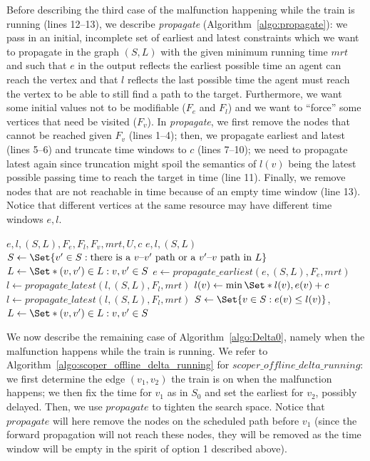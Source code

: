 \documentclass{article}
\begin{document}
Before describing the third case of the malfunction happening while the train is running (lines 12--13), we describe \emph{propagate} (Algorithm~\ref{algo:propagate}): we pass in an initial, incomplete set of earliest and latest constraints which we want to propagate in the graph $(S,L)$ with the given minimum running time $mrt$ and such that $e$ in the output reflects the earliest possible time an agent can reach the vertex and that  $l$ reflects the last possible time the agent must reach the vertex to be able to still find a path to the target. Furthermore, we want some initial values not to be modifiable ($F_e$ and $F_l$) and we want to ``force'' some vertices that need be visited ($F_v$). In \emph{propagate}, we first remove the nodes that cannot be reached given $F_v$ (lines 1--4); then, we propagate earliest and latest (lines 5--6) and truncate time windows to $c$ (lines 7--10); we need to propagate latest again since truncation might spoil the semantics of $l(v)$ being the latest possible passing time to reach the target in time (line 11). Finally, we remove nodes that are not reachable in time because of an empty time window (line 13). Notice that different vertices at the same resource may have different time windows $e,l$.

\begin{algorithm}
	\caption{$propagate$} \label{algo:propagate}
	\begin{algorithmic}[1]
	    \Require $e,l,(S,L),F_e,F_l,F_v,mrt,U,c$
	    \Ensure $e,l,(S,L)$
		    \State $S \leftarrow \Set{v^\prime \in S: \textrm{there is a }v\textrm{--}v^\prime\textrm{ path or a }v^\prime\textrm{--}v\textrm{ path in }L}$
		    \State $L \leftarrow \Set*{(v,v^\prime) \in L: v,v^\prime \in S}$
		\EndFor
	    \State $e \leftarrow propagate\_earliest(e, (S,L), F_e, mrt)$
		\State $l \leftarrow propagate\_latest(l,(S,L),F_l, mrt)$
	        \State $l(v) \leftarrow \min \Set*{l(v), e(v)+c}$
	    \EndFor
	    \State $l \leftarrow propagate\_latest(l,(S,L),F_l, mrt)$
	    \EndIf
		\State $S \leftarrow \Set{v \in S: e(v) \leq l(v)}$, $L \leftarrow \Set*{(v,v^\prime) \in L: v,v^\prime \in S}$

	\end{algorithmic}
\end{algorithm}



We now describe the remaining case of Algorithm~\ref{algo:Delta0}, namely when the malfunction happens while the train is running. We refer to Algorithm~\ref{algo:scoper_offline_delta_running} for $scoper\_offline\_delta\_running$: we first determine the edge $(v_1,v_2)$ the train is on when the malfunction happens; we then fix the time for $v_1$ as in $S_0$ and set the earliest for $v_2$, possibly delayed. Then, we use $propagate$ to tighten the search space. Notice that $propagate$ will here remove the nodes on the scheduled path before $v_1$ (since the forward propagation will not reach these nodes, they will be removed as the time window will be empty in the spirit of option 1 described above).
\end{document}
